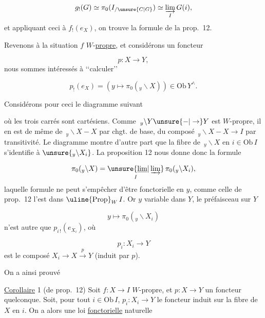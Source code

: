\[
g_!(G)\simeq\pi_0(I_{/\unsure{C|G}})\simeq\underset{I}{\varinjlim}\,G(i),
\]
et appliquant ceci à $f_!(e_X)$, on trouve la formule \unsure{($\alpha$)} de la prop.~12.

Revenons à la situation  $f$ $W$-\uline{propre}, et considérons un foncteur

\[
p:X\longrightarrow Y,
\]
nous sommes intéressés à \lq\lq calculer\rq\rq

\[
p_!(e_X)=(y\mapsto\pi_0({}_y\backslash X))\in\mathrm{Ob}\,Y^\wedge .
\]

Considérons pour ceci le diagramme suivant

où les trois carrés sont cartésiens. Comme $\,{}_y\backslash Y\unsure{-|\to}Y$ est $W$-propre, il en est de même de $\,{}_y\backslash X-X$ par chgt. de base,  du composé $\,{}_y\backslash X-X\longrightarrow I$ par transitivité. Le diagramme montre d'autre part que la fibre de $\,{}_y\backslash X$ en $i\in\mathrm{Ob}\,I$ s'identifie à $\unsure{{}_y\backslash X_i}$.
La proposition 12 nous donne donc la formule

\[
\pi_0({}_y\backslash X)=\underset{I}{\unsure{\underline{\lim}|\varinjlim}}\,\pi_0({}_y\backslash X_i),
\]
laquelle formule ne peut s'empêcher d'être fonctorielle en $y$,  comme celle de prop.~12  l'est dans $\text{\uline{Prop}}_W\,I$. Or  $y$ variable dans $Y$, le  préfaisceau sur $Y$

\[
y\longmapsto\pi_0({}_y\backslash X_i)
\]
n'est autre que $p_{i\,!}(e_{X_i})$, où

\[
p_i:X_i\longrightarrow Y
\]
est le composé $X_i\to X\xrightarrow{p}Y$ (induit par $p$).

On a ainsi prouvé

\uline{Corollaire} 1 (de prop.~12) Soit $f:X\to I$ $W$-propre,
 et $p:X\to Y$ un foncteur quelconque. Soit, pour tout $i\in\mathrm{Ob}\,I$, $p_i:X_i\to Y$ le foncteur induit sur la fibre  de $X$ en $i$. On a alors une loi \uline{fonctorielle} naturelle

